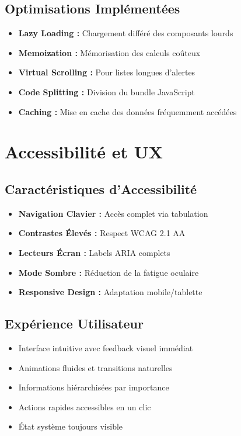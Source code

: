 \documentclass[a4paper,12pt]{article}
\begin{document}
\subsection{Optimisations Implémentées}

\begin{itemize}
    \item \textbf{Lazy Loading :} Chargement différé des composants lourds
    \item \textbf{Memoization :} Mémorisation des calculs coûteux
    \item \textbf{Virtual Scrolling :} Pour listes longues d'alertes
    \item \textbf{Code Splitting :} Division du bundle JavaScript
    \item \textbf{Caching :} Mise en cache des données fréquemment accédées
\end{itemize}

\section{Accessibilité et UX}

\subsection{Caractéristiques d'Accessibilité}

\begin{itemize}
    \item \textbf{Navigation Clavier :} Accès complet via tabulation
    \item \textbf{Contrastes Élevés :} Respect WCAG 2.1 AA
    \item \textbf{Lecteurs Écran :} Labels ARIA complets
    \item \textbf{Mode Sombre :} Réduction de la fatigue oculaire
    \item \textbf{Responsive Design :} Adaptation mobile/tablette
\end{itemize}

\subsection{Expérience Utilisateur}

\begin{tcolorbox}[colback=primaryblue!10, colframe=primaryblue, title={\faIcon{user-circle} UX Design}]
\begin{itemize}
    \item Interface intuitive avec feedback visuel immédiat
    \item Animations fluides et transitions naturelles
    \item Informations hiérarchisées par importance
    \item Actions rapides accessibles en un clic
    \item État système toujours visible
\end{itemize}
\end{tcolorbox}
\end{document}
